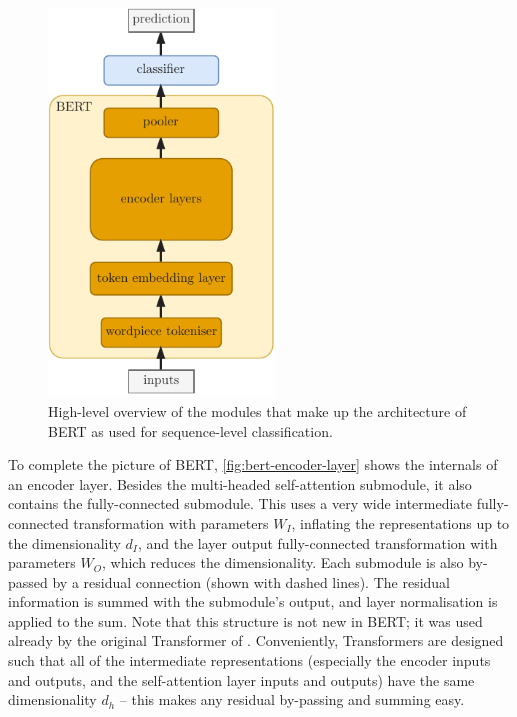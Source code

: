 \documentclass[bsc,frontabs,twoside,singlespacing,parskip,deptreport]{infthesis}
\begin{document}
{{{      \begin{figure}[h!t]
        \centering
        \includegraphics[width=6cm]{graphics/bert-hl}
        \caption{High-level overview of the modules that make up the architecture of BERT as used for sequence-level classification.}
        \label{fig:bert-hl}
      \end{figure}

      To complete the picture of BERT, \autoref{fig:bert-encoder-layer} shows the internals of an encoder layer. Besides the multi-headed self-attention submodule, it also contains the fully-connected submodule. This uses a very wide intermediate fully-connected transformation with parameters $W_I$, inflating the representations up to the dimensionality $d_I$, and the layer output fully-connected transformation with parameters $W_O$, which reduces the dimensionality. Each submodule is also by-passed by a residual connection (shown with dashed lines). The residual information is summed with the submodule's output, and layer normalisation is applied to the sum. Note that this structure is not new in BERT; it was used already by the original Transformer of \citet{Vaswani_2017}. Conveniently, Transformers are designed such that all of the intermediate representations (especially the encoder inputs and outputs, and the self-attention layer inputs and outputs) have the same dimensionality $d_h$ -- this makes any residual by-passing and summing easy.

}}}
\end{document}
